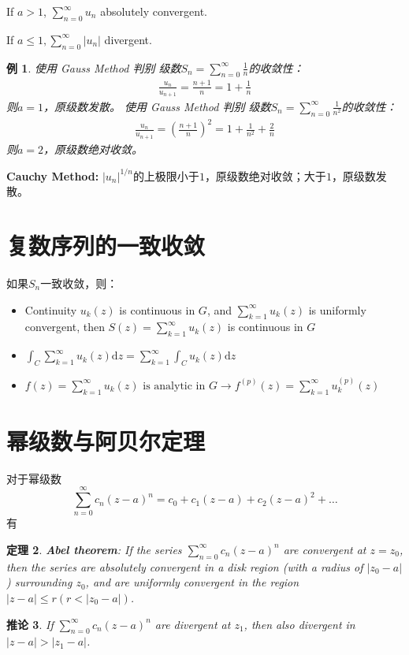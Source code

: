 \documentclass[10pt, a4paper, oneside]{ctexbook}
\newtheorem{theorem}{定理}[section]
\newtheorem{corollary}[theorem]{推论}
\newtheorem{example}[theorem]{例}
\def\D{\mathrm{d}}
\begin{document}
If $a>1$, $\displaystyle \sum_{n=0}^{\infty} u_{n}$ absolutely convergent. 

If $\displaystyle a \leq 1, \sum_{n=0}^{\infty}\left|u_{n}\right|$ divergent.

\begin{example}
    使用 {\rm Gauss Method} 判别 级数$\displaystyle S_n=\sum_{n=0}^\infty \frac{1}{n}$的收敛性：
    \begin{align*}
        \frac{u_n}{u_{n+1}}=\frac{n+1}{n}=1+\frac{1}{n}
    \end{align*}
    则$a=1$，原级数发散。
    \newline
    使用 {\rm Gauss Method} 判别 级数$\displaystyle S_n=\sum_{n=0}^\infty \frac{1}{n^2}$的收敛性：
    \begin{align*}
        \frac{u_n}{u_{n+1}}=\left(\frac{n+1}{n}\right)^2=1+\frac{1}{n^2}+\frac{2}{n}
    \end{align*}
    则$a=2$，原级数绝对收敛。
\end{example}

\textbf{Cauchy Method: }$\displaystyle |u_n|^{1/n}$的上极限小于$1$，原级数绝对收敛；大于$1$，原级数发散。

\section{复数序列的一致收敛}

如果$S_n$一致收敛，则：
\begin{itemize}
    \item Continuity $u_{k}(z)$ is continuous in $G$, and $\sum_{k=1}^{\infty} u_{k}(z)$ is uniformly convergent, then $S(z)=\sum_{k=1}^{\infty} u_{k}(z)$ is continuous in $G$
    \item $\displaystyle
    \int_{C} \sum_{k=1}^{\infty} u_{k}(z) \D z=\sum_{k=1}^{\infty} \int_{C} u_{k}(z) \D z
    $
    \item $\displaystyle
        f(z)=\sum_{k=1}^{\infty} u_{k}(z) \text { is analytic in } G \to
        f^{(p)}(z)=\sum_{k=1}^{\infty} u_{k}^{(p)}(z)
        $
\end{itemize}

\section{幂级数与阿贝尔定理}

对于幂级数
\begin{equation*}
    \sum_{n=0}^{\infty} c_{n}(z-a)^{n}=c_{0}+c_{1}(z-a)+c_{2}(z-a)^{2}+\ldots
\end{equation*} 有
\begin{theorem}\rm
    \textbf{Abel theorem}: If the series $\displaystyle \sum_{n=0}^{\infty} c_{n}(z-a)^{n}$ are convergent at $z=z_{0}$, then
the series are absolutely convergent in a disk region (with a radius of $\left|z_{0}-a\right|$ ) surrounding $z_{0}$, and are uniformly convergent in the region $|z-a| \leq r\left(r<\left|z_{0}-a\right|\right)$.
\end{theorem}
\begin{corollary}\rm
    If $\displaystyle \sum_{n=0}^{\infty} c_{n}(z-a)^{n}$ are divergent at $z_{1}$, then also divergent in $|z-a|>\left|z_{1}-a\right|$.
\end{corollary}
\end{document}
